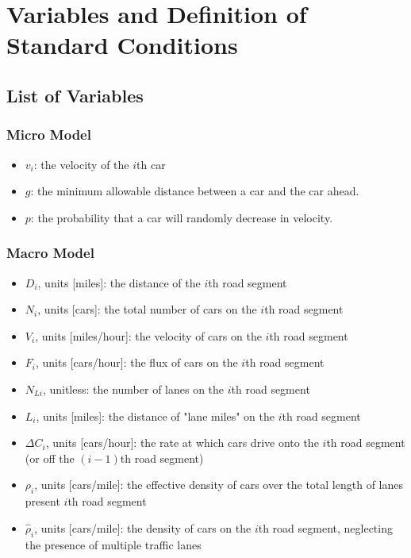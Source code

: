 \section{Variables and Definition of Standard Conditions} \label{sec:vars_defns}


\subsection{List of Variables}

\subsubsection{Micro Model}
\begin{itemize}
	\item $v_i$: the velocity of the $i$th car
    \item $g$: the minimum allowable distance between a car and the car ahead.
    \item $p$: the probability that a car will randomly decrease in velocity.
\end{itemize}

\subsubsection{Macro Model}
\begin{itemize}
	\item $D_i$, units [miles]: the distance of the $i$th road segment
    \item $N_i$, units [cars]: the total number of cars on the $i$th road segment
    \item $V_i$, units [miles/hour]: the velocity of cars on the $i$th road segment
    \item $F_i$, units [cars/hour]: the flux of cars on the $i$th road segment
    \item $N_{Li}$, unitless: the number of lanes on the $i$th road segment
    \item $L_i$, units [miles]: the distance of "lane miles" on the $i$th road segment
    \item $\Delta C_i$, units [cars/hour]: the rate at which cars drive onto the $i$th road segment (or off the $(i - 1)$th road segment) 
    \item $\rho_i$, units [cars/mile]: the effective density of cars over the total length of lanes present $i$th road segment
    \item $\hat{\rho}_i$, units [cars/mile]: the density of cars on the $i$th road segment, neglecting the presence of multiple traffic lanes
\end{itemize}

